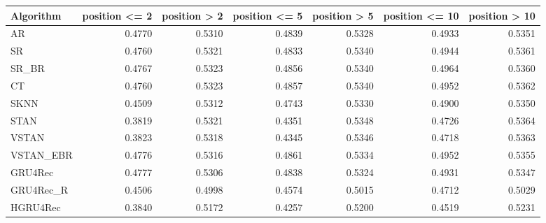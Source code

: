 \begin{tabular}{lrrrrrr}
\toprule
 Algorithm &  position <= 2 &  position > 2 &  position <= 5 &  position > 5 &  position <= 10 &  position > 10 \\
\midrule
        AR &         0.4770 &        0.5310 &         0.4839 &        0.5328 &          0.4933 &         0.5351 \\
        SR &         0.4760 &        0.5321 &         0.4833 &        0.5340 &          0.4944 &         0.5361 \\
     SR\_BR &         0.4767 &        0.5323 &         0.4856 &        0.5340 &          0.4964 &         0.5360 \\
        CT &         0.4760 &        0.5323 &         0.4857 &        0.5340 &          0.4952 &         0.5362 \\
      SKNN &         0.4509 &        0.5312 &         0.4743 &        0.5330 &          0.4900 &         0.5350 \\
      STAN &         0.3819 &        0.5321 &         0.4351 &        0.5348 &          0.4726 &         0.5364 \\
     VSTAN &         0.3823 &        0.5318 &         0.4345 &        0.5346 &          0.4718 &         0.5363 \\
 VSTAN\_EBR &         0.4776 &        0.5316 &         0.4861 &        0.5334 &          0.4952 &         0.5355 \\
   GRU4Rec &         0.4777 &        0.5306 &         0.4838 &        0.5324 &          0.4931 &         0.5347 \\
 GRU4Rec\_R &         0.4506 &        0.4998 &         0.4574 &        0.5015 &          0.4712 &         0.5029 \\
  HGRU4Rec &         0.3840 &        0.5172 &         0.4257 &        0.5200 &          0.4519 &         0.5231 \\
\bottomrule
\end{tabular}
